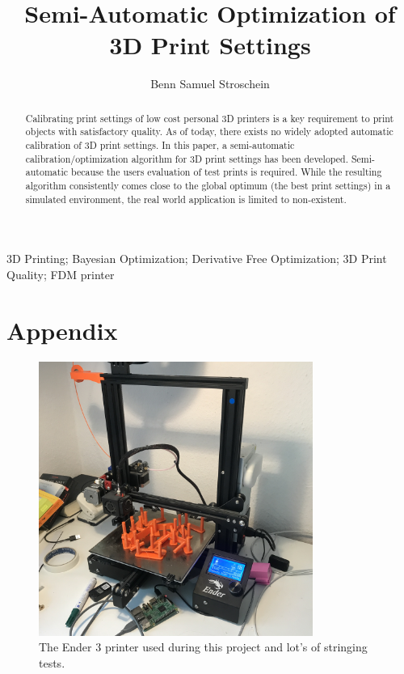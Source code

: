 \documentclass[a4paper, times, 10pt,top=3.5cm,bottom=3.5cm,left=3cm,right=3cm]{article}
\begin{document}
\linespread{0.5}

\title{Semi-Automatic Optimization of 3D Print Settings}

\author{Benn Samuel Stroschein}



\maketitle 
\thispagestyle{fancy} 
\pagestyle{fancy}


\begin{abstract}
Calibrating print settings of low cost personal 3D printers is a key requirement to print objects with satisfactory quality. As of today, there exists no widely adopted automatic calibration of 3D print settings. In this paper, a semi-automatic calibration/optimization algorithm for 3D print settings has been developed. Semi-automatic because the users evaluation of test prints is required. While the resulting algorithm consistently comes close to the global optimum (the best print settings) in a simulated environment, the real world application is limited to non-existent. 
\end{abstract}

\begin{keywords}
3D Printing; Bayesian Optimization; Derivative Free Optimization; 3D Print Quality; FDM printer
\end{keywords}





\newpage






\pagebreak


\section{Appendix}

\begin{figure}[!htb]
    \centering
    \includegraphics[width=0.8\textwidth]{assets/enderPrinter.JPG}
    \caption{The Ender 3 printer used during this project and lot's of stringing tests.}
    \label{appendix/enderPrinter}
\end{figure}
\end{document}
